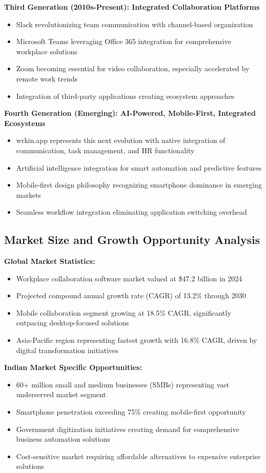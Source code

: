\textbf{Third Generation (2010s-Present): Integrated Collaboration Platforms}
\begin{itemize}
    \item Slack revolutionizing team communication with channel-based organization
    \item Microsoft Teams leveraging Office 365 integration for comprehensive workplace solutions
    \item Zoom becoming essential for video collaboration, especially accelerated by remote work trends
    \item Integration of third-party applications creating ecosystem approaches
\end{itemize}

\textbf{Fourth Generation (Emerging): AI-Powered, Mobile-First, Integrated Ecosystems}
\begin{itemize}
    \item wrkin.app represents this next evolution with native integration of communication, task management, and HR functionality
    \item Artificial intelligence integration for smart automation and predictive features
    \item Mobile-first design philosophy recognizing smartphone dominance in emerging markets
    \item Seamless workflow integration eliminating application switching overhead
\end{itemize}

\subsection{Market Size and Growth Opportunity Analysis}

\textbf{Global Market Statistics:}
\begin{itemize}
    \item Workplace collaboration software market valued at \$47.2 billion in 2024
    \item Projected compound annual growth rate (CAGR) of 13.2\% through 2030
    \item Mobile collaboration segment growing at 18.5\% CAGR, significantly outpacing desktop-focused solutions
    \item Asia-Pacific region representing fastest growth with 16.8\% CAGR, driven by digital transformation initiatives
\end{itemize}

\textbf{Indian Market Specific Opportunities:}
\begin{itemize}
    \item 60+ million small and medium businesses (SMBs) representing vast underserved market segment
    \item Smartphone penetration exceeding 75\% creating mobile-first opportunity
    \item Government digitization initiatives creating demand for comprehensive business automation solutions
    \item Cost-sensitive market requiring affordable alternatives to expensive enterprise solutions
\end{itemize}

